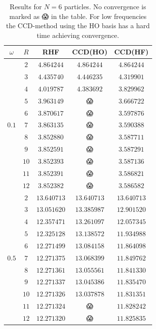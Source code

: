 \documentclass[
    a4paper, aps, twocolumn, floatfix, superscriptaddress,
    nofootinbib]{revtex4-1}
\newcommand{\nan}{{\DejaSans 😱}}
\newcommand{\1}{\mathds{1}}
\begin{document}
        \begin{table}
            \centering
            \caption{Results for $N = 6$ particles. No convergence is marked as
            {\nan} in the table. For low frequencies the CCD-method using the HO
            basis has a hard time achieving convergence.}
            \begin{ruledtabular}
                \begin{tabular}{c|c|ccc}
                    $\omega$ & $R$ & RHF & CCD(HO) & CCD(HF) \\ \hline
                             &  $2$  & $4.864244$ & $4.864244$ & $4.864244$ \\
                             &  $3$  & $4.435740$ & $4.446235$ & $4.319901$ \\
                             &  $4$  & $4.019787$ & $4.383692$ & $3.829962$ \\
                             &  $5$  & $3.963149$ & \nan & $3.666722$ \\
                             &  $6$  & $3.870617$ & \nan & $3.597876$ \\
                      $0.1$  &  $7$  & $3.863135$ & \nan & $3.590388$ \\
                             &  $8$  & $3.852880$ & \nan & $3.587711$ \\
                             &  $9$  & $3.852591$ & \nan & $3.587291$ \\
                             &  $10$ & $3.852393$ & \nan & $3.587136$ \\
                             &  $11$ & $3.852391$ & \nan & $3.586821$ \\
                             &  $12$ & $3.852382$ & \nan & $3.586582$ \\ \hline

                             &  $2$  & $13.640713$ & $13.640713$ & $13.640713$ \\
                             &  $3$  & $13.051620$ & $13.385987$ & $12.901520$ \\
                             &  $4$  & $12.357471$ & $13.261097$ & $12.057345$ \\
                             &  $5$  & $12.325128$ & $13.138572$ & $11.934988$ \\
                             &  $6$  & $12.271499$ & $13.084158$ & $11.864098$ \\
                      $0.5$  &  $7$  & $12.271375$ & $13.068399$ & $11.849762$ \\
                             &  $8$  & $12.271361$ & $13.055561$ & $11.841330$ \\
                             &  $9$  & $12.271337$ & $13.045386$ & $11.835470$ \\
                             &  $10$ & $12.271326$ & $13.037878$ & $11.831351$ \\
                             &  $11$ & $12.271324$ & \nan & $11.828242$ \\
                             &  $12$ & $12.271320$ & \nan & $11.825835$ \\ \hline


\end{tabular}
\end{ruledtabular}
\end{table}
\end{document}
